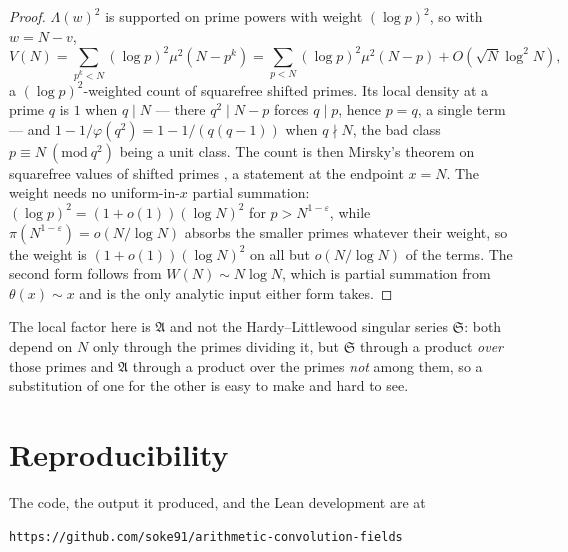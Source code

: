 \documentclass[11pt,a4paper]{article}
\theoremstyle{plain}
\theoremstyle{definition}
\theoremstyle{remark}
\renewcommand{\SS}{\mathfrak{S}}
\newcommand{\AAA}{\mathfrak{A}}
\begin{document}
\begin{proof}
$\Lambda(w)^2$ is supported on prime powers with weight $(\log p)^2$,
so with $w=N-v$,
\[
  V(N)=\sum_{p^k<N}(\log p)^2\mu^2(N-p^k)
      =\sum_{p<N}(\log p)^2\mu^2(N-p)+O(\sqrt N\log^2N),
\]
a $(\log p)^2$-weighted count of squarefree shifted primes. Its local
density at a prime $q$ is $1$ when $q\mid N$ --- there $q^2\mid N-p$
forces $q\mid p$, hence $p=q$, a single term --- and
$1-1/\varphi(q^2)=1-1/(q(q-1))$ when $q\nmid N$, the bad class
$p\equiv N\ (\mathrm{mod}\ q^2)$ being a unit class. The count is then
Mirsky's theorem on squarefree values of shifted primes
\cite{Mir49}, a statement at the endpoint $x=N$. The weight needs no
uniform-in-$x$ partial summation: $(\log p)^2=(1+o(1))(\log N)^2$ for
$p>N^{1-\varepsilon}$, while $\pi(N^{1-\varepsilon})=o(N/\log N)$
absorbs the smaller primes whatever their weight, so the weight is
$(1+o(1))(\log N)^2$ on all but $o(N/\log N)$ of the terms. The second
form follows from $W(N)\sim N\log N$, which is partial summation from
$\theta(x)\sim x$ and is the only analytic input either form takes.
\end{proof}

\noindent
The local factor here is $\AAA$ and not the Hardy--Littlewood singular
series $\SS$: both depend on $N$ only through the primes dividing it,
but $\SS$ through a product \emph{over} those primes and $\AAA$ through
a product over the primes \emph{not} among them, so a substitution of
one for the other is easy to make and hard to see.

\section{Reproducibility}\label{sec:repro}

The code, the output it produced, and the Lean development are at

\begin{center}
\texttt{https://github.com/soke91/arithmetic-convolution-fields}
\end{center}
\end{document}
